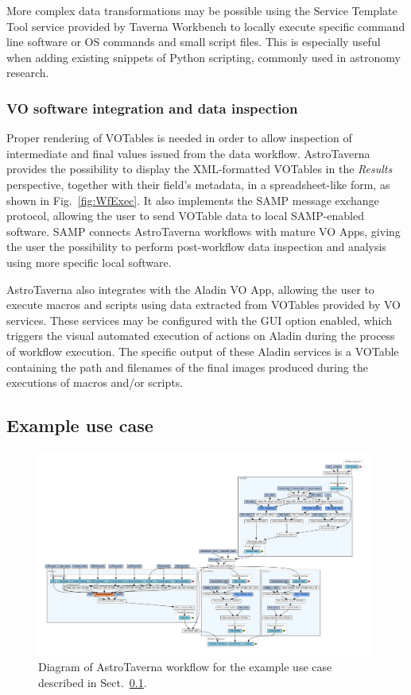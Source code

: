 \documentclass{aa}
\begin{document}
More complex data transformations may be possible using the Service Template Tool service provided by Taverna Workbench to locally execute specific command line software or OS commands and small script files. This is especially useful when adding existing snippets of Python scripting, commonly used in astronomy research.  

\subsubsection{VO software integration and data inspection}
\label{VOApps}

Proper rendering of VOTables is needed in order to allow inspection of intermediate and final values issued from the data workflow. AstroTaverna provides the possibility to display the XML-formatted VOTables in the \emph{Results} perspective, together with their field’s metadata, in a spreadsheet-like form, as shown in Fig.~\ref{fig:WfExec}. It also implements the SAMP message exchange protocol, allowing the user to send VOTable data to local SAMP-enabled software. SAMP connects AstroTaverna workflows with mature VO Apps, giving the user the possibility to perform post-workflow data inspection and analysis using more specific local software.

AstroTaverna also integrates with the Aladin VO App, allowing the user to execute macros and scripts using data extracted from VOTables provided by VO services. These services may be configured with the GUI option enabled, which triggers the visual automated execution of actions on Aladin during the process of workflow execution. The specific output of these Aladin services is a VOTable containing the path and filenames of the final images produced during the executions of macros and/or scripts.  

\subsection{Example use case}
\label{Usecase}

\begin{figure}[tb]
\centering 
\includegraphics[width=0.99\textwidth]{WfDiagram}
\caption{Diagram of AstroTaverna workflow for the example use case described in Sect.~\ref{Usecase}.}
\label{fig:WfDiagram}
\end{figure}
\end{document}
